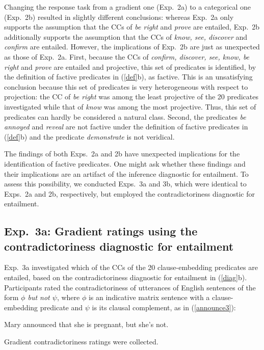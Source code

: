 \documentclass[11pt,fleqn]{article}
\newcommand{\6}{\mbox{$[\hspace*{-.6mm}[$}}
\newcommand{\9}{\mbox{$]\hspace*{-.6mm}]$}}
\begin{document}
Changing the response task from a gradient one (Exp.~2a) to a categorical one (Exp.~2b) resulted in slightly different conclusions: whereas Exp.~2a only supports the assumption that the CCs of {\em be right} and {\em prove} are entailed, Exp.~2b additionally supports the assumption that the CCs of {\em know, see, discover} and {\em confirm} are entailed. However, the implications of Exp.~2b are just as unexpected as those of Exp.~2a. First, because the CCs of {\em confirm, discover, see, know, be right} and {\em prove} are entailed and projective, this set of predicates is identified, by the definition of factive predicates in (\ref{def}b), as factive. This is an unsatisfying conclusion because this set of predicates is very heterogeneous with respect to projection:  the CC of {\em be right} was among the least projective of the 20 predicates investigated while that of {\em know} was among the most projective. Thus, this set of predicates can hardly be considered a natural class. Second, the predicates {\em be annoyed} and {\em reveal} are  not factive under the definition of factive predicates in (\ref{def}b) and the predicate {\em demonstrate} is  not veridical. 

The findings of both Exps.~2a and 2b have unexpected implications for the identification of factive predicates. One might ask whether these findings and their implications are an artifact of the inference diagnostic for entailment. To assess this possibility, we conducted Exps.~3a and 3b, which were identical to Exps.~2a and 2b, respectively, but employed the contradictoriness diagnostic for entailment.

\subsection{Exp.~3a: Gradient ratings using the contradictoriness diagnostic for entailment}\label{s32}

Exp.~3a investigated which of the CCs of the 20 clause-embedding predicates are entailed, based on the contradictoriness diagnostic for entailment in (\ref{diag}b). Participants rated the contradictoriness of utterances of English sentences of the form {\em $\phi$ but not $\psi$}, where $\phi$ is an indicative matrix sentence with a clause-embedding predicate and $\psi$ is its clausal complement, as in (\ref{announce3}):

\begin{exe}
\ex\label{announce3} Mary announced that she is pregnant, but she's not.
\end{exe}
Gradient contradictoriness ratings were collected.
\end{document}
